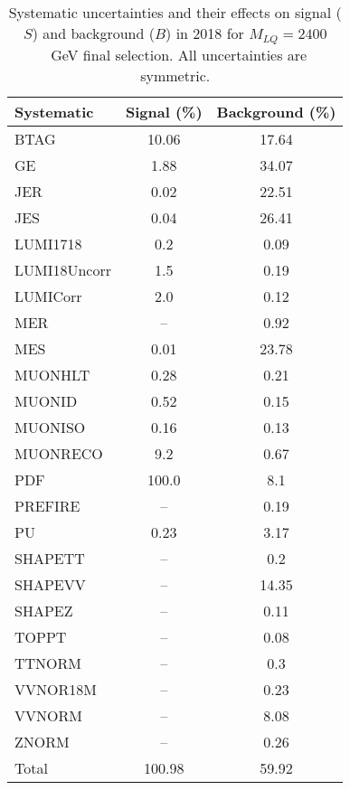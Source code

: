 \begin{table}[htbp]
\begin{center}
\caption{Systematic uncertainties and their effects on signal ($S$) and background ($B$) in 2018 for $M_{LQ}=2400$~GeV final selection. All uncertainties are symmetric.}
\begin{tabular}{lcc}
\hline\hline
Systematic & Signal (\%) & Background (\%) \\ \hline 
BTAG & 10.06 & 17.64\\ 
GE & 1.88 & 34.07\\ 
JER & 0.02 & 22.51\\ 
JES & 0.04 & 26.41\\ 
LUMI1718 & 0.2 & 0.09\\ 
LUMI18Uncorr & 1.5 & 0.19\\ 
LUMICorr & 2.0 & 0.12\\ 
MER & -- & 0.92\\ 
MES & 0.01 & 23.78\\ 
MUONHLT & 0.28 & 0.21\\ 
MUONID & 0.52 & 0.15\\ 
MUONISO & 0.16 & 0.13\\ 
MUONRECO & 9.2 & 0.67\\ 
PDF & 100.0 & 8.1\\ 
PREFIRE & -- & 0.19\\ 
PU & 0.23 & 3.17\\ 
SHAPETT & -- & 0.2\\ 
SHAPEVV & -- & 14.35\\ 
SHAPEZ & -- & 0.11\\ 
TOPPT & -- & 0.08\\ 
TTNORM & -- & 0.3\\ 
VVNOR18M & -- & 0.23\\ 
VVNORM & -- & 8.08\\ 
ZNORM & -- & 0.26\\ 
Total & 100.98 & 59.92\\ \hline \hline
\end{tabular}
\label{tab:SysUncertainties_uujj_2400}
\end{center}
\end{table}

